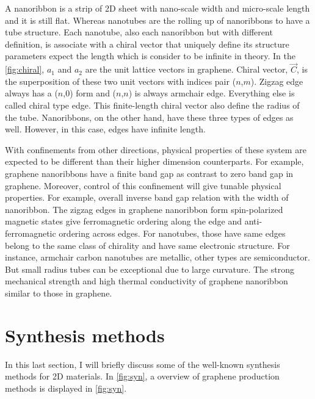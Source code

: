 A nanoribbon is a strip of 2D sheet with nano-scale width and micro-scale length and it is still flat. Whereas nanotubes are the rolling up of nanoribbons to have a tube structure. Each nanotube, also each nanoribbon but with different definition, is associate with a chiral vector that uniquely define its structure parameters expect the length which is consider to be infinite in theory. In the \autoref{fig:chiral}, $a_1$ and $a_2$ are the unit lattice vectors in graphene.  Chiral vector, $\vec{C}$, is the superposition of these two unit vectors with indices pair ($n$,$m$). Zigzag edge always has a ($n$,0) form and ($n$,$n$) is always armchair edge. Everything else is called chiral type edge.  This finite-length chiral vector also define the radius of the tube. Nanoribbons, on the other hand, have these three types of edges as well. However, in this case, edges have infinite length. 

With confinements from other directions, physical properties of these system are expected to be different than their higher dimension counterparts. For example, graphene nanoribbons have a finite band gap as contrast to zero band gap in graphene\cite{Wang2008}. Moreover, control of this confinement will give tunable physical properties. For example, overall inverse band gap relation with the width of nanoribbon\cite{Han2007}. The zigzag edges in graphene nanoribbon form spin-polarized magnetic states give ferromagnetic ordering along the edge and anti-ferromagnetic ordering across edges\cite{Son2006}. For nanotubes, those have same edges belong to the same class of chirality and have same electronic structure. For instance, armchair carbon nanotubes are metallic, other types are semiconductor. But small radius tubes can be exceptional due to large curvature\cite{Bandaru2007}.  The strong mechanical strength and high thermal conductivity of graphene nanoribbon similar to those in graphene.

\section{Synthesis methods}

In this last section, I will briefly discuss some of the well-known synthesis methods for 2D materials. In \autoref{fig:syn}, a overview of graphene production methods is displayed in \autoref{fig:syn}. 

